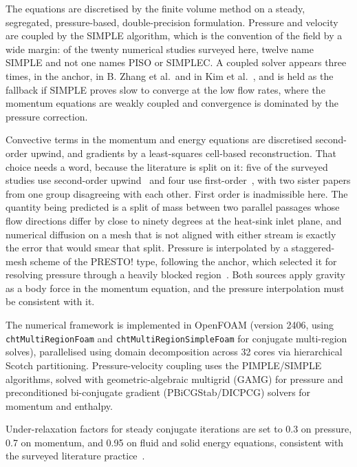 The equations are discretised by the finite volume method on a steady, segregated, pressure-based,
double-precision formulation. Pressure and velocity are coupled by the SIMPLE algorithm, which is
the convention of the field by a wide margin: of the twenty numerical studies surveyed here, twelve
name SIMPLE and not one names PISO or SIMPLEC. A coupled solver appears three times, in the anchor,
in B. Zhang et al.\ and in Kim et al.~\cite{chun2026,zhang2026,kim2025}, and is held as the
fallback if SIMPLE proves
slow to converge at the low flow rates, where the momentum equations are weakly coupled and
convergence is dominated by the pressure correction.

Convective terms in the momentum and energy equations are discretised second-order upwind, and
gradients by a least-squares cell-based reconstruction. That choice needs a word, because the
literature is split on it: five of the surveyed studies use second-order
upwind~\cite{dong2026,khoshvaghtaliabadi2025,huang2023ijhmt,cai2019,shahsavar2021} and four use
first-order~\cite{khoshvaghtaliabadi2026oblique,khoshvaghtaliabadi2026component,ni2024,lee2006},
with two sister papers from one group disagreeing with each other. First order is inadmissible
here. The quantity being predicted is a split of mass between two parallel passages whose flow
directions differ by close to ninety degrees at the heat-sink inlet plane, and numerical diffusion
on a mesh that is not aligned with either stream is exactly the error that would smear that split.
Pressure is interpolated by a staggered-mesh scheme of the PRESTO! type, following the anchor,
which selected it for resolving pressure through a heavily blocked region~\cite{chun2026}. Both
sources apply gravity as a body force in the momentum equation, and the pressure interpolation must
be consistent with it.

The numerical framework is implemented in OpenFOAM (version 2406, using \texttt{chtMultiRegionFoam} and \texttt{chtMultiRegionSimpleFoam} for conjugate multi-region solves), parallelised using domain decomposition across 32 cores via hierarchical Scotch partitioning. Pressure-velocity coupling uses the PIMPLE/SIMPLE algorithms, solved with geometric-algebraic multigrid (GAMG) for pressure and preconditioned bi-conjugate gradient (PBiCGStab/DICPCG) solvers for momentum and enthalpy.

Under-relaxation factors for steady conjugate iterations are set to 0.3 on pressure, 0.7 on momentum, and 0.95 on fluid and solid energy equations, consistent with the surveyed literature practice~\cite{dong2026,huang2023ijhmt,khoshvaghtaliabadi2025}.

